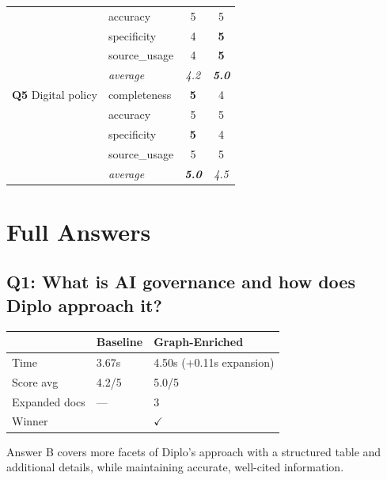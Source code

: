 \documentclass[11pt,a4paper]{article}
\newcommand{\winner}[1]{\textbf{\textcolor{graphwin}{#1}}}
\begin{document}
\begin{center}
\begin{tabular}{llcc}
                            & accuracy & 5 & 5 \\
                            & specificity & 4 & \textbf{5} \\
                            & source\_usage & 4 & \textbf{5} \\
                            & \textit{average} & \textit{4.2} & \textit{\textbf{5.0}} \\
\midrule
\textbf{Q5} Digital policy & completeness & \textbf{5} & 4 \\
                             & accuracy & 5 & 5 \\
                             & specificity & \textbf{5} & 4 \\
                             & source\_usage & 5 & 5 \\
                             & \textit{average} & \textit{\textbf{5.0}} & \textit{4.5} \\
\bottomrule
\end{tabular}
\end{center}

\section{Full Answers}

\subsection{Q1: What is AI governance and how does Diplo approach it?}

\begin{tabularx}{\textwidth}{lXX}
\toprule
& \textbf{Baseline} & \textbf{Graph-Enriched} \\
\midrule
Time & 3.67s & 4.50s (+0.11s expansion) \\
Score avg & 4.2/5 & 5.0/5 \\
Expanded docs & --- & 3 \\
Winner & & \winner{$\checkmark$} \\
\bottomrule
\end{tabularx}

\begin{tcolorbox}[colback=judgebox, colframe=orange!40!black, title=Judge Reasoning]
Answer B covers more facets of Diplo's approach with a structured table and additional details, while maintaining accurate, well-cited information.
\end{tcolorbox}
\end{document}
